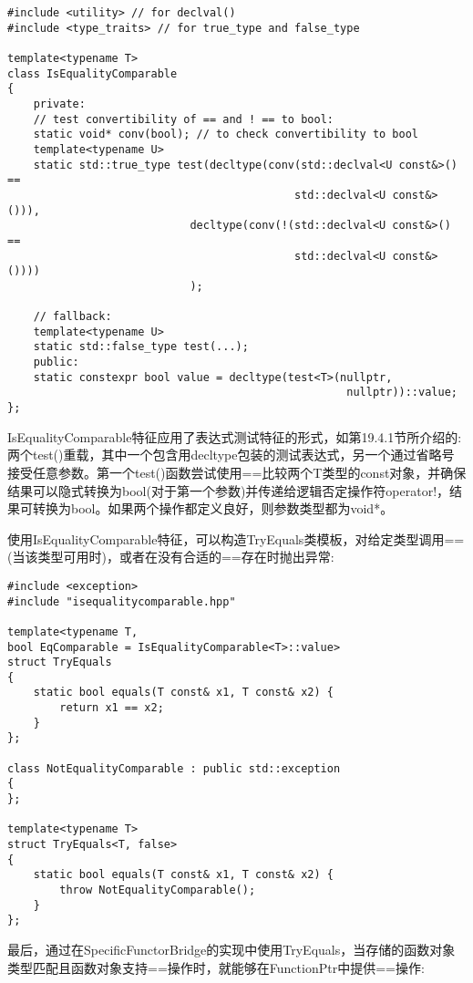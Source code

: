 \begin{lstlisting}[style=styleCXX]
#include <utility> // for declval()
#include <type_traits> // for true_type and false_type

template<typename T>
class IsEqualityComparable
{
	private:
	// test convertibility of == and ! == to bool:
	static void* conv(bool); // to check convertibility to bool
	template<typename U>
	static std::true_type test(decltype(conv(std::declval<U const&>() ==
											std::declval<U const&>())),
							decltype(conv(!(std::declval<U const&>() ==
											std::declval<U const&>())))
							);
	
	// fallback:
	template<typename U>
	static std::false_type test(...);
	public:
	static constexpr bool value = decltype(test<T>(nullptr,
													nullptr))::value;
};
\end{lstlisting}

IsEqualityComparable特征应用了表达式测试特征的形式，如第19.4.1节所介绍的:两个test()重载，其中一个包含用decltype包装的测试表达式，另一个通过省略号接受任意参数。第一个test()函数尝试使用==比较两个T类型的const对象，并确保结果可以隐式转换为bool(对于第一个参数)并传递给逻辑否定操作符operator!，结果可转换为bool。如果两个操作都定义良好，则参数类型都为void*。

使用IsEqualityComparable特征，可以构造TryEquals类模板，对给定类型调用==(当该类型可用时)，或者在没有合适的==存在时抛出异常:

\begin{lstlisting}[style=styleCXX]
#include <exception>
#include "isequalitycomparable.hpp"

template<typename T,
bool EqComparable = IsEqualityComparable<T>::value>
struct TryEquals
{
	static bool equals(T const& x1, T const& x2) {
		return x1 == x2;
	}
};

class NotEqualityComparable : public std::exception
{
};

template<typename T>
struct TryEquals<T, false>
{
	static bool equals(T const& x1, T const& x2) {
		throw NotEqualityComparable();
	}
};
\end{lstlisting}

最后，通过在SpecificFunctorBridge的实现中使用TryEquals，当存储的函数对象类型匹配且函数对象支持==操作时，就能够在FunctionPtr中提供==操作:

